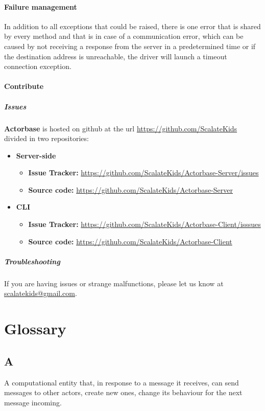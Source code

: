 \documentclass{scalatekids-article}
\begin{document}
\paragraph{Failure management}

In addition to all exceptions that could be raised, there is one error that is
shared by every method and that is in case of a communication error, which can
be caused by not receiving a response from the server in a predetermined time or
if the destination address is unreachable, the driver will launch a
timeout connection exception.

\paragraph{Contribute}

\subparagraph{Issues}

\textbf{Actorbase} is hosted on github at the url
\url{https://github.com/ScalateKids} divided in two repositories:

\begin{itemize}
\item\textbf{Server-side}
  \begin{itemize}
  \item \textbf{Issue Tracker:} \url{https://github.com/ScalateKids/Actorbase-Server/issues}
  \item \textbf{Source code:} \url{https://github.com/ScalateKids/Actorbase-Server}
  \end{itemize}
\item\textbf{CLI}
  \begin{itemize}
  \item \textbf{Issue Tracker:} \url{https://github.com/ScalateKids/Actorbase-Client/isssues}
  \item \textbf{Source code:} \url{https://github.com/ScalateKids/Actorbase-Client}
  \end{itemize}
\end{itemize}

\subparagraph{Troubleshooting}

If you are having issues or strange malfunctions, please let us know at
\href{mailto:scalatekids@gmail.com}{scalatekids@gmail.com}.

\newpage
\appendix

\section{Glossary}
\label{sec:Glossary}
\subsection{A}
 A computational entity that, in response to a message
it receives, can send messages to other actors, create new ones, change its
behaviour for the next message incoming.
\end{document}
